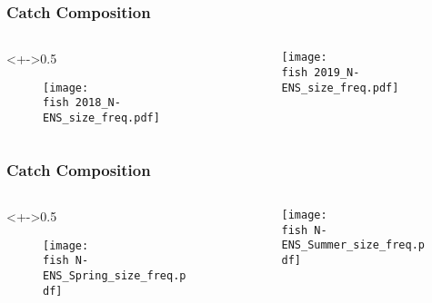 \documentclass{beamer}
\begin{document}
\begin{frame}
\frametitle{Catch Composition}

\begin{columns}
\begin{column}<+->{0.5\textwidth}
 \vspace*{-0.5cm}
\begin{figure}
\centerline{\texttt{[image: \\fish 2018\_N-ENS\_size\_freq.pdf]}}

\end{figure}
\end{column}

\begin{column}{0.5\textwidth}
\begin{figure}
 \vspace*{-0.5cm}

\centerline{\texttt{[image: \\fish 2019\_N-ENS\_size\_freq.pdf]}}

 \end{figure}

\end{column}
\end{columns}


\end{frame}





\begin{frame}
\frametitle{Catch Composition}

\begin{columns}
\begin{column}<+->{0.5\textwidth}
 \vspace*{-0.5cm}
\begin{figure}
\centerline{\texttt{[image: \\fish N-ENS\_Spring\_size\_freq.pdf]}}

\end{figure}
\end{column}

\begin{column}{0.5\textwidth}

\vspace*{-0.5cm}
\begin{figure}

\centerline{\texttt{[image: \\fish N-ENS\_Summer\_size\_freq.pdf]}}

\end{figure}

\end{column}
\end{columns}


\end{frame}
\end{document}
